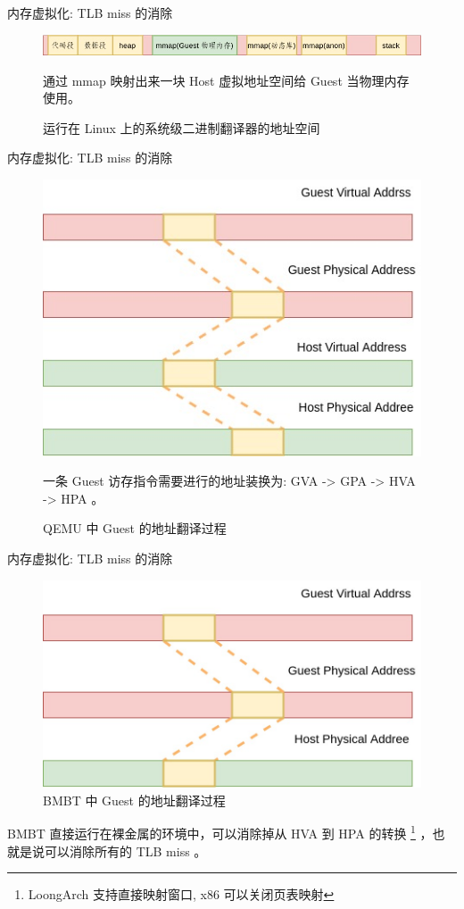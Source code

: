 \documentclass{beamer}
\begin{document}
\begin{frame}{内存虚拟化: TLB miss 的消除}
	\begin{figure}
		\includegraphics[width=0.8\linewidth]{../paper/images/sys-as2.jpg}
		\caption{运行在 Linux 上的系统级二进制翻译器的地址空间}
		通过 mmap 映射出来一块 Host 虚拟地址空间给 Guest 当物理内存使用。
	\end{figure}
\end{frame}

\begin{frame}{内存虚拟化: TLB miss 的消除}
	\begin{figure}
		\includegraphics[width=0.45\linewidth]{../paper/images/sys-as.jpg}
		\caption{QEMU 中 Guest 的地址翻译过程}
		\begin{flushleft}
			一条 Guest 访存指令需要进行的地址装换为: GVA -> GPA -> HVA -> HPA 。
		\end{flushleft}
	\end{figure}
\end{frame}

\begin{frame}{内存虚拟化: TLB miss 的消除}
	\begin{figure}
		\includegraphics[width=0.6\linewidth]{../paper/images/sys-as3.jpg}
		\caption{BMBT 中 Guest 的地址翻译过程}
	\end{figure}
	BMBT 直接运行在裸金属的环境中，可以消除掉从 HVA 到 HPA 的转换
	\footnote{LoongArch 支持直接映射窗口, x86 可以关闭页表映射}
	，也就是说可以消除所有的 TLB miss 。
\end{frame}
\end{document}
